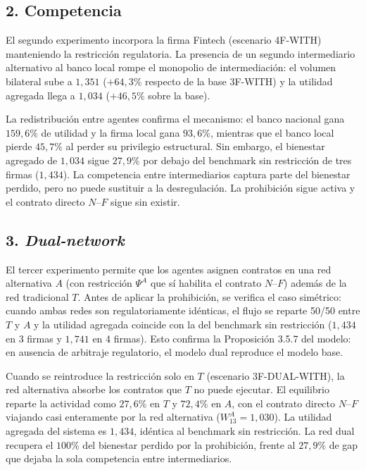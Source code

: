 \documentclass[12pt,a4paper]{article}
\begin{document}
\subsection*{2. Competencia}

El segundo experimento incorpora la firma Fintech (escenario 4F-WITH) manteniendo la
restricción regulatoria. La presencia de un segundo intermediario alternativo al banco local
rompe el monopolio de intermediación: el volumen bilateral sube a $1{,}351$ ($+64{,}3\%$
respecto de la base 3F-WITH) y la utilidad agregada llega a $1{,}034$ ($+46{,}5\%$ sobre la base).

La redistribución entre agentes confirma el mecanismo: el banco nacional gana $159{,}6\%$ de
utilidad y la firma local gana $93{,}6\%$, mientras que el banco local pierde $45{,}7\%$ al perder
su privilegio estructural. Sin embargo, el bienestar agregado de $1{,}034$ sigue $27{,}9\%$ por
debajo del benchmark sin restricción de tres firmas ($1{,}434$). La competencia entre
intermediarios captura parte del bienestar perdido, pero no puede sustituir a la
desregulación. La prohibición sigue activa y el contrato directo $N$--$F$ sigue sin existir.

\subsection*{3. \textit{Dual-network}}

El tercer experimento permite que los agentes asignen contratos en una red alternativa $A$ (con
restricción $\Psi^A$ que sí habilita el contrato $N$--$F$) además de la red tradicional $T$. Antes
de aplicar la prohibición, se verifica el caso simétrico: cuando ambas redes son
regulatoriamente idénticas, el flujo se reparte 50/50 entre $T$ y $A$ y la utilidad agregada
coincide con la del benchmark sin restricción ($1{,}434$ en 3 firmas y $1{,}741$ en 4 firmas).
Esto confirma la Proposición 3.5.7 del modelo: en ausencia de arbitraje regulatorio, el modelo
dual reproduce el modelo base.

Cuando se reintroduce la restricción solo en $T$ (escenario 3F-DUAL-WITH), la red alternativa
absorbe los contratos que $T$ no puede ejecutar. El equilibrio reparte la actividad como
$27{,}6\%$ en $T$ y $72{,}4\%$ en $A$, con el contrato directo $N$--$F$ viajando casi enteramente
por la red alternativa ($W_{13}^A = 1{,}030$). La utilidad agregada del sistema es $1{,}434$,
idéntica al benchmark sin restricción. La red dual recupera el $100\%$ del bienestar perdido por
la prohibición, frente al $27{,}9\%$ de gap que dejaba la sola competencia entre intermediarios.
\end{document}
